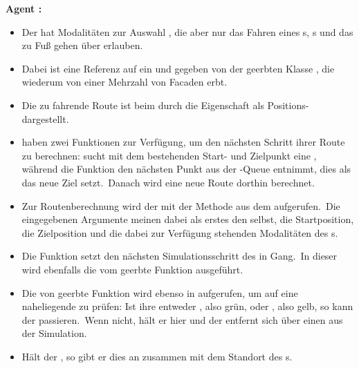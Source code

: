\textbf{Agent :}
\begin{itemize}
    \item Der  hat Modalitäten zur Auswahl , die aber nur das Fahren eines s, s und das zu Fuß gehen über  erlauben.
    \item Dabei ist eine Referenz auf ein  und  gegeben von der geerbten Klasse , die wiederum von einer Mehrzahl von Facaden erbt.
    \item Die zu fahrende Route ist beim  durch die Eigenschaft  als Positions- dargestellt.
    \item {} haben zwei Funktionen zur Verfügung, um den nächsten Schritt ihrer Route zu berechnen:  sucht mit dem bestehenden Start- und Zielpunkt eine , während die Funktion  den nächsten Punkt aus der -Queue entnimmt, dies als das neue Ziel setzt.~Danach wird eine neue Route dorthin berechnet.
    \item Zur Routenberechnung wird der  mit der Methode\linebreak{} aus dem  aufgerufen.~Die eingegebenen Argumente meinen dabei als erstes den  selbst, die Startposition, die Zielposition und die dabei zur Verfügung stehenden Modalitäten des s.
    \item Die Funktion  setzt den nächsten Simulationsschritt des  in Gang.~In dieser wird ebenfalls die vom  geerbte Funktion  ausgeführt.
    \item Die von  geerbte Funktion  wird ebenso in  aufgerufen, um auf eine naheliegende  zu prüfen: Ist ihre  entweder , also grün, oder , also gelb, so kann der  passieren.~Wenn nicht, hält er hier und der  entfernt sich über einen  aus der Simulation.
    \item Hält der , so gibt er dies an zusammen mit dem Standort des s.
\end{itemize}

